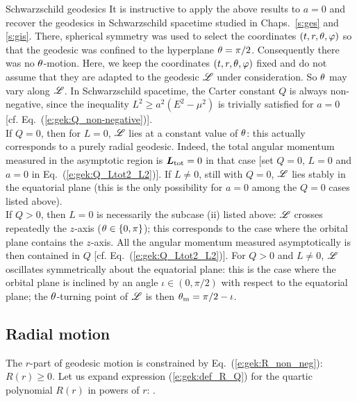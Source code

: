 \begin{texample}{Schwarzschild geodesics}{}
It is instructive to apply the above results to $a=0$ and recover
the geodesics in Schwarzschild spacetime studied in Chaps.~\ref{s:ges} and \ref{s:gis}.
There, spherical symmetry was used to select the coordinates $(t,r,\theta,\varphi)$ so that
the geodesic was confined to the hyperplane $\theta=\pi/2$. Consequently there was
no $\theta$-motion. Here, we keep the coordinates $(t,r,\theta,\varphi)$ fixed and do not
assume that they are adapted to the geodesic $\mathscr{L}$ under consideration. So $\theta$
may vary along $\mathscr{L}$. In Schwarzschild spacetime, the Carter constant $Q$
is always non-negative, since the inequality $L^2 \geq a^2(E^2-\mu^2)$ is
trivially satisfied for $a=0$ [cf. Eq.~(\ref{e:gek:Q_non-negative})].\\
If $Q=0$, then for $L=0$, $\mathscr{L}$ lies at a constant value of $\theta$: this actually
corresponds to a purely radial geodesic. Indeed,
the total angular momentum measured in the asymptotic region is $\bm{L}_{\rm tot} = 0$
in that case [set $Q=0$, $L=0$ and $a=0$ in Eq.~(\ref{e:gek:Q_Ltot2_L2})].
If $L\neq 0$, still with $Q=0$,
$\mathscr{L}$ lies stably in the equatorial plane (this is the only possibility for $a=0$ among
the $Q=0$ cases listed above).\\
If $Q>0$, then $L=0$ is necessarily the subcase (ii) listed above:
$\mathscr{L}$ crosses repeatedly the $z$-axis ($\theta\in\{0,\pi\}$); this corresponds to the case where
the orbital plane contains the $z$-axis. All the angular momentum measured asymptotically
is then contained in $Q$ [cf. Eq.~(\ref{e:gek:Q_Ltot2_L2})].
For $Q>0$ and $L\neq 0$, $\mathscr{L}$ oscillates symmetrically about the equatorial
plane: this is the case where the orbital plane is inclined by an angle
$\iota\in(0,\pi/2)$
with respect to the equatorial plane; the $\theta$-turning point of $\mathscr{L}$ is then
$\theta_{\rm m} = \pi/2-\iota$.
\end{texample}


\subsection{Radial motion} \label{s:gek:r-motion}

The $r$-part of geodesic motion is constrained by Eq.~(\ref{e:gek:R_non_neg}):
$R(r) \geq 0$. Let us expand expression (\ref{e:gek:def_R_Q})
for the quartic polynomial $R(r)$ in powers of $r$:
\be \label{e:gek:R_r_powers}
     .
\ee


